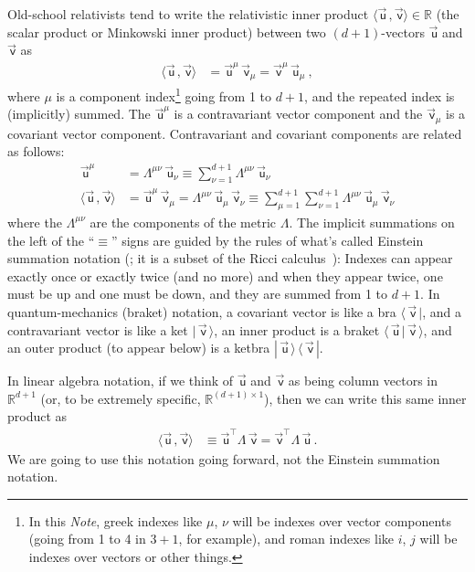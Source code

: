 \documentclass{article}
\newcommand\upvec[1]{\!\vec{\,\mathrm{#1}}}
\newcommand{\Lvec}[1]{\upvec{\mathsf{#1}}} %
\newcommand{\inner}[2]{\langle{#1}\,,{#2}\rangle}
\newcommand{\bra}[1]{\langle\,{#1}\,|}
\newcommand{\ket}[1]{|\,{#1}\,\rangle}
\newcommand{\braket}[2]{\langle\,{#1}\,|\,{#2}\,\rangle}
\newcommand{\ketbra}[2]{|\,{#1}\,\rangle\,\langle\,{#2}\,|}
\newcommand{\plus}{\!+\!} %
\newcommand{\documentname}{\textsl{Note}}
\begin{document}
Old-school relativists tend to write the relativistic inner product $\inner{\Lvec{u}}{\Lvec{v}}\in\mathbb{R}$ (the scalar product or Minkowski inner product) between two $(d\plus1)$-vectors $\Lvec{u}$ and $\Lvec{v}$ as
\begin{align}
    \inner{\Lvec{u}}{\Lvec{v}} &= \Lvec{u}^\mu\,\Lvec{v}_\mu = \Lvec{v}^\mu\,\Lvec{u}_\mu ~,
\end{align}
where $\mu$ is a component index\footnote{In this \documentname{}, greek indexes like $\mu$, $\nu$ will be indexes over vector components (going from 1 to 4 in $3\plus1$, for example), and roman indexes like $i$, $j$ will be indexes over vectors or other things.} going from 1 to $d+1$, and the repeated index is (implicitly) summed.
The $\Lvec{u}^\mu$ is a contravariant vector component and the $\Lvec{v}_\mu$ is a covariant vector component.
Contravariant and covariant components are related as follows:
\begin{align}
    \Lvec{u}^\mu &= \Lambda^{\mu\nu}\,\Lvec{u}_\nu \equiv \sum_{\nu=1}^{d+1} \Lambda^{\mu\nu}\,\Lvec{u}_\nu
    \\
    \inner{\Lvec{u}}{\Lvec{v}} &= \Lvec{u}^\mu\,\Lvec{v}_\mu = \Lambda^{\mu\nu}\,\Lvec{u}_\mu\,\Lvec{v}_\nu \equiv \sum_{\mu=1}^{d+1}\sum_{\nu=1}^{d+1} \Lambda^{\mu\nu}\,\Lvec{u}_\mu\,\Lvec{v}_\nu
\end{align}
where the $\Lambda^{\mu\nu}$ are the components of the metric $\Lambda$.
The implicit summations on the left of the ``$\equiv$'' signs are guided by the rules of what's called Einstein summation notation (\cite{summation}; it is a subset of the Ricci calculus~\cite{ricci}): Indexes can appear exactly once or exactly twice (and no more) and when they appear twice, one must be up and one must be down, and they are summed from 1 to $d+1$.
In quantum-mechanics (braket) notation, a covariant vector is like a bra $\bra{\Lvec{v}}$, and a contravariant vector is like a ket $\ket{\Lvec{v}}$,
an inner product is a braket $\braket{\Lvec{u}}{\Lvec{v}}$, and an outer product (to appear below) is a ketbra $\ketbra{\Lvec{u}}{\Lvec{v}}$.

In linear algebra notation, if we think of $\Lvec{u}$ and $\Lvec{v}$ as being column vectors in $\mathbb{R}^{d+1}$ (or, to be extremely specific, $\mathbb{R}^{(d+1)\times 1}$), then we can write this same inner product as
\begin{align}\label{eq:inner}
    \inner{\Lvec{u}}{\Lvec{v}} &\equiv \Lvec{u}^\top\Lambda\,\Lvec{v} = \Lvec{v}^\top\Lambda\,\Lvec{u} ~.
\end{align}
We are going to use this notation going forward, not the Einstein summation notation.
\end{document}
